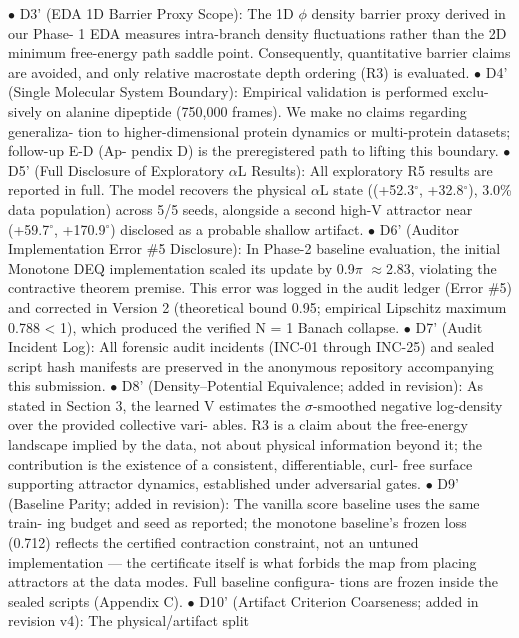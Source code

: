\documentclass{article}
\begin{document}
$\bullet$  D3' (EDA 1D Barrier Proxy Scope): The 1D $\phi$ density barrier proxy derived in our Phase-
1 EDA measures intra-branch density fluctuations rather than the 2D minimum free-energy
path saddle point. Consequently, quantitative barrier claims are avoided, and only relative
macrostate depth ordering (R3) is evaluated.
$\bullet$  D4' (Single Molecular System Boundary): Empirical validation is performed exclu-
sively on alanine dipeptide (750,000 frames). We make no claims regarding generaliza-
tion to higher-dimensional protein dynamics or multi-protein datasets; follow-up E-D (Ap-
pendix D) is the preregistered path to lifting this boundary.
$\bullet$  D5' (Full Disclosure of Exploratory $\alpha$L Results): All exploratory R5 results are reported
in full. The model recovers the physical $\alpha$L state ((+52.3$^\circ$, +32.8$^\circ$), 3.0\% data population)
across 5/5 seeds, alongside a second high-V attractor near (+59.7$^\circ$, +170.9$^\circ$) disclosed as
a probable shallow artifact.
$\bullet$  D6' (Auditor Implementation Error \#5 Disclosure): In Phase-2 baseline evaluation, the
initial Monotone DEQ implementation scaled its update by 0.9$\pi$ $\approx$2.83, violating the
contractive theorem premise. This error was logged in the audit ledger (Error \#5) and
corrected in Version 2 (theoretical bound 0.95; empirical Lipschitz maximum 0.788 < 1),
which produced the verified N = 1 Banach collapse.
$\bullet$  D7' (Audit Incident Log): All forensic audit incidents (INC-01 through INC-25) and
sealed script hash manifests are preserved in the anonymous repository accompanying this
submission.
$\bullet$  D8' (Density--Potential Equivalence; added in revision): As stated in Section 3, the
learned V estimates the $\sigma$-smoothed negative log-density over the provided collective vari-
ables. R3 is a claim about the free-energy landscape implied by the data, not about physical
information beyond it; the contribution is the existence of a consistent, differentiable, curl-
free surface supporting attractor dynamics, established under adversarial gates.
$\bullet$  D9' (Baseline Parity; added in revision): The vanilla score baseline uses the same train-
ing budget and seed as reported; the monotone baseline's frozen loss (0.712) reflects the
certified contraction constraint, not an untuned implementation --- the certificate itself is
what forbids the map from placing attractors at the data modes. Full baseline configura-
tions are frozen inside the sealed scripts (Appendix C).
$\bullet$  D10' (Artifact Criterion Coarseness; added in revision v4): The physical/artifact split
\end{document}
